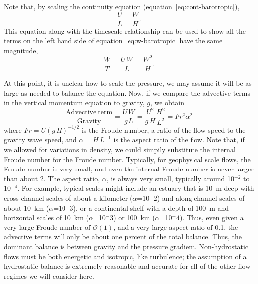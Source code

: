 \documentclass[11pt]{report}
\numberwithin{equation}{section}
\begin{document}
Note that, by scaling the continuity equation (equation~\ref{eq:cont-barotropic}),
\begin{equation}
    \frac{U}{L} = \frac{W}{H}.
\end{equation}
This equation along with the timescale relationship can be used to show all the terms on the left hand side of equation~\ref{eq:w-barotropic} have the same magnitude,
\begin{equation}
    \frac{W}{T} = \frac{U\,W}{L} = \frac{W^2}{H}.
\end{equation}

At this point, it is unclear how to scale the pressure, we may assume it will be as large as needed to balance the equation. Now, if we compare the advective terms in the vertical momentum equation to gravity, $g$, we obtain
\begin{equation}
    \frac{\mathrm{Advective~term}}{\mathrm{Gravity}} = \frac{U\,W}{g\,L} = \frac{U^2}{g\,H}\frac{H^2}{L^2} = Fr^2 \alpha^2 
\end{equation}
where $Fr=U (g\,H)^{-1/2}$ is the Froude number, a ratio of the flow speed to the gravity wave speed, and $\alpha=H\,L^{-1}$ is the aspect ratio of the flow.  Note that, if we allowed for variations in density, we could simpily substitute the internal Froude number for the Froude number.  Typically, for geophysical scale flows, the Froude number is very small, and even the internal Froude number is never larger than about 2.  The aspect ratio, $\alpha$, is always very small, typically around 10$^{-2}$ to 10$^{-4}$.  For example, typical scales might include an estuary that is 10~m deep with cross-channel scales of about a kilometer ($\alpha$=10$^-2$) and along-channel scales of about 10~km ($\alpha$=10$^-3$), or a continental shelf with a depth of 100~m and horizontal scales of 10~km ($\alpha$=10$^-3$) or 100~km ($\alpha$=10$^-4$).  Thus, even given a very large Froude number of $\mathcal{O}(1)$, and a very large aspect ratio of 0.1, the advective terms will only be about one percent of the total balance.  Thus, the dominant balance is between gravity and the pressure gradient.  Non-hydrostatic flows must be both energetic and isotropic, like turbulence; the assumption of a hydrostatic balance is extremely reasonable and accurate for all of the other flow regimes we will consider here.
\end{document}
